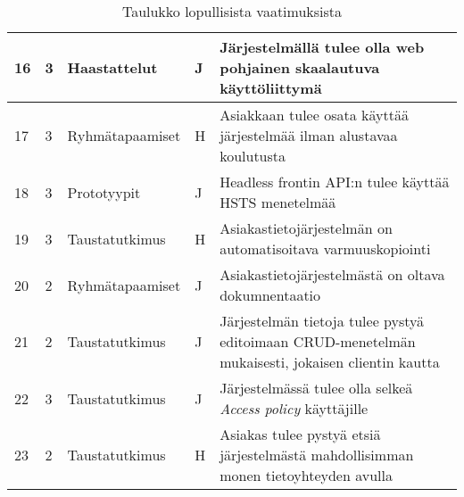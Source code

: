 \begin{landscape}
\begin{table}[]
{\begin{tabular}{lllll}
    \multicolumn{1}{|l|}{16}		&			 \multicolumn{1}{|l|}{3}& \multicolumn{1}{l|}{Haastattelut}	& \multicolumn{1}{l|}{J}                                    & \multicolumn{1}{l|}{Järjestelmällä tulee olla web pohjainen skaalautuva käyttöliittymä}                               \\ \hline
    \multicolumn{1}{|l|}{17}		&			 \multicolumn{1}{|l|}{3}& \multicolumn{1}{l|}{Ryhmätapaamiset}	& \multicolumn{1}{l|}{H}                                    & \multicolumn{1}{l|}{Asiakkaan tulee osata käyttää järjestelmää ilman alustavaa koulutusta}                               \\ \hline
    \multicolumn{1}{|l|}{18}		&			 \multicolumn{1}{|l|}{3}& \multicolumn{1}{l|}{Prototyypit}	& \multicolumn{1}{l|}{J}                                    & \multicolumn{1}{l|}{Headless frontin API:n tulee käyttää HSTS menetelmää}																	\\ \hline
    \multicolumn{1}{|l|}{19}		&			 \multicolumn{1}{|l|}{3}& \multicolumn{1}{l|}{Taustatutkimus}	& \multicolumn{1}{l|}{H}                                    & \multicolumn{1}{l|}{Asiakastietojärjestelmän on automatisoitava varmuuskopiointi}								\\ \hline
    \multicolumn{1}{|l|}{20}		&			 \multicolumn{1}{|l|}{2}& \multicolumn{1}{l|}{Ryhmätapaamiset}	& \multicolumn{1}{l|}{J}                                    & \multicolumn{1}{l|}{Asiakastietojärjestelmästä on oltava dokumnentaatio}														\\ \hline
    \multicolumn{1}{|l|}{21}		&			 \multicolumn{1}{|l|}{2}& \multicolumn{1}{l|}{Taustatutkimus}	& \multicolumn{1}{l|}{J}                                    & \multicolumn{1}{l|}{Järjestelmän tietoja tulee pystyä editoimaan CRUD-menetelmän mukaisesti, jokaisen clientin kautta}									\\ \hline
    \multicolumn{1}{|l|}{22}		&			 \multicolumn{1}{|l|}{3}& \multicolumn{1}{l|}{Taustatutkimus}	& \multicolumn{1}{l|}{J}                                    & \multicolumn{1}{l|}{Järjestelmässä tulee olla selkeä \textit{Access policy} käyttäjille}						\\ \hline
    \multicolumn{1}{|l|}{23}		&			 \multicolumn{1}{|l|}{2}& \multicolumn{1}{l|}{Taustatutkimus}	& \multicolumn{1}{l|}{H}                                    & \multicolumn{1}{l|}{Asiakas tulee pystyä etsiä järjestelmästä mahdollisimman monen tietoyhteyden avulla}						\\ \hline
                         
    


\end{tabular}
}
    \caption{Taulukko lopullisista vaatimuksista}
    \label{tab:vaatimukset2}
    \end{table}	
\end{landscape}